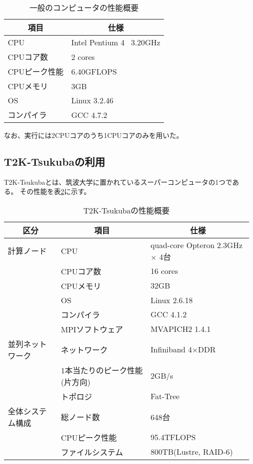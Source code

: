 \begin{table}[htb]
	\begin{center}
	\begin{tabular}{|l|l|}
\hline \hline
\multicolumn{1}{|c|}{項目} & \multicolumn{1}{|c|}{仕様} \\
\hline \hline
CPU & Intel Pentium 4 \ 3.20GHz \\
CPUコア数 & 2 cores \\
CPUピーク性能 & 6.40GFLOPS \\
CPUメモリ & 3GB \\
OS & Linux 3.2.46 \\
コンパイラ & GCC 4.7.2 \\
\hline
	\end{tabular}
	\end{center}
	\caption{一般のコンピュータの性能概要}
	\label{tb:normalpc-perf}
\end{table}

なお、実行には2CPUコアのうち1CPUコアのみを用いた。


\subsection{T2K-Tsukubaの利用}
T2K-Tsukubaとは、筑波大学に置かれているスーパーコンピュータの1つである。
その性能を表\ref{tb:t2k-perf}に示す。

\begin{table}[htb]
	\begin{center}
	\begin{tabular}{|l|l|l|}
\hline \hline
\multicolumn{1}{|c|}{区分} & \multicolumn{1}{|c|}{項目} & \multicolumn{1}{|c|}{仕様} \\
\hline \hline
計算ノード & CPU & quad-core Opteron 2.3GHz $\times$ 4台 \\
& CPUコア数 & 16 cores \\
& CPUメモリ & 32GB \\
& OS & Linux 2.6.18 \\
& コンパイラ & GCC 4.1.2 \\
& MPIソフトウェア & MVAPICH2 1.4.1 \\
\hline
並列ネットワーク & ネットワーク & Infiniband 4$\times$DDR \\
& 1本当たりのピーク性能(片方向) & 2GB/s \\
& トポロジ & Fat-Tree \\\hline
全体システム構成 & 総ノード数 & 648台 \\
& CPUピーク性能 & 95.4TFLOPS \\
& ファイルシステム & 800TB(Lustre, RAID-6) \\\hline
	\end{tabular}
	\end{center}
 	\caption{T2K-Tsukubaの性能概要}
	\label{tb:t2k-perf}
\end{table}

